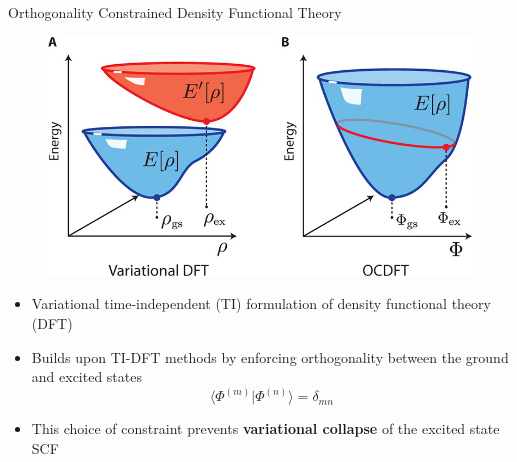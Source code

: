 \documentclass[t]{beamer}
\begin{document}
\begin{frame}{Orthogonality Constrained Density Functional Theory}
\begin{figure}[!t]
\includegraphics[scale=1.0]{ocdft_fig.jpeg}
\end{figure}
\begin{itemize}
\item Variational time-independent (TI) formulation of density functional theory (DFT)
\item Builds upon TI-DFT methods by enforcing orthogonality between the ground and excited states
\begin{equation}
\langle \Phi^{(m)} | \Phi^{(n)} \rangle = \delta_{mn}
\end{equation}
\item This choice of constraint prevents \textbf{variational collapse} of the excited state SCF
\end{itemize}
\end{frame}
\end{document}
